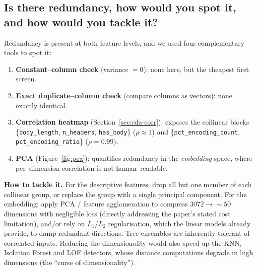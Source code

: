 \documentclass[11pt,a4paper]{article}
\begin{document}
\subsection{Is there redundancy, how would you spot it, and how would you tackle it?}
\label{sec:fe-redundancy}
Redundancy is present at both feature levels, and we used four complementary tools to spot
it:
\begin{enumerate}[nosep,leftmargin=1.4em]
  \item \textbf{Constant--column check} (variance $=0$): none here, but the cheapest first
        screen.
  \item \textbf{Exact duplicate--column check} (compare columns as vectors): none exactly
        identical.
  \item \textbf{Correlation heatmap} (Section~\ref{sec:eda-corr}): exposes the collinear
        blocks \{\texttt{body\_length}, \texttt{n\_headers}, \texttt{has\_body}\}
        ($\rho\!\approx\!1$) and \{\texttt{pct\_encoding\_count},
        \texttt{pct\_encoding\_ratio}\} ($\rho=0.99$).
  \item \textbf{PCA} (Figure~\ref{fig:pca}): quantifies redundancy in the
        \emph{embedding} space, where per--dimension correlation is not human--readable.
\end{enumerate}
\textbf{How to tackle it.} For the descriptive features: drop all but one member of each
collinear group, or replace the group with a single principal component. For the embedding:
apply PCA / feature agglomeration to compress $3072\!\rightarrow\!\sim\!50$ dimensions with
negligible loss (directly addressing the paper's stated cost limitation), and/or rely on
$L_1$/$L_2$ regularisation, which the linear models already provide, to damp redundant
directions. Tree ensembles are inherently tolerant of correlated inputs. Reducing the
dimensionality would also speed up the KNN, Isolation Forest and LOF detectors, whose
distance computations degrade in high dimensions (the ``curse of dimensionality'').
\end{document}
